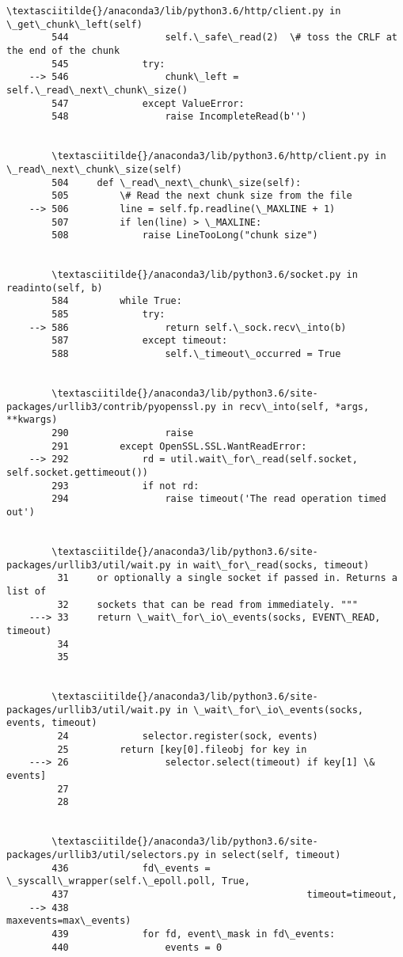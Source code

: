 \documentclass[11pt]{article}
\begin{document}
\begin{Verbatim}[commandchars=\\\{\}]
        \textasciitilde{}/anaconda3/lib/python3.6/http/client.py in \_get\_chunk\_left(self)
        544                 self.\_safe\_read(2)  \# toss the CRLF at the end of the chunk
        545             try:
    --> 546                 chunk\_left = self.\_read\_next\_chunk\_size()
        547             except ValueError:
        548                 raise IncompleteRead(b'')


        \textasciitilde{}/anaconda3/lib/python3.6/http/client.py in \_read\_next\_chunk\_size(self)
        504     def \_read\_next\_chunk\_size(self):
        505         \# Read the next chunk size from the file
    --> 506         line = self.fp.readline(\_MAXLINE + 1)
        507         if len(line) > \_MAXLINE:
        508             raise LineTooLong("chunk size")


        \textasciitilde{}/anaconda3/lib/python3.6/socket.py in readinto(self, b)
        584         while True:
        585             try:
    --> 586                 return self.\_sock.recv\_into(b)
        587             except timeout:
        588                 self.\_timeout\_occurred = True


        \textasciitilde{}/anaconda3/lib/python3.6/site-packages/urllib3/contrib/pyopenssl.py in recv\_into(self, *args, **kwargs)
        290                 raise
        291         except OpenSSL.SSL.WantReadError:
    --> 292             rd = util.wait\_for\_read(self.socket, self.socket.gettimeout())
        293             if not rd:
        294                 raise timeout('The read operation timed out')


        \textasciitilde{}/anaconda3/lib/python3.6/site-packages/urllib3/util/wait.py in wait\_for\_read(socks, timeout)
         31     or optionally a single socket if passed in. Returns a list of
         32     sockets that can be read from immediately. """
    ---> 33     return \_wait\_for\_io\_events(socks, EVENT\_READ, timeout)
         34 
         35 


        \textasciitilde{}/anaconda3/lib/python3.6/site-packages/urllib3/util/wait.py in \_wait\_for\_io\_events(socks, events, timeout)
         24             selector.register(sock, events)
         25         return [key[0].fileobj for key in
    ---> 26                 selector.select(timeout) if key[1] \& events]
         27 
         28 


        \textasciitilde{}/anaconda3/lib/python3.6/site-packages/urllib3/util/selectors.py in select(self, timeout)
        436             fd\_events = \_syscall\_wrapper(self.\_epoll.poll, True,
        437                                          timeout=timeout,
    --> 438                                          maxevents=max\_events)
        439             for fd, event\_mask in fd\_events:
        440                 events = 0



\end{Verbatim}
\end{document}
